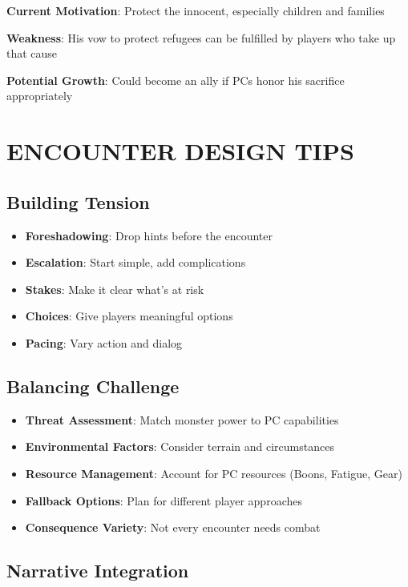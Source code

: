 \documentclass[12pt]{article}
\begin{document}
\begin{itemize}
\textbf{Current Motivation}: Protect the innocent, especially children and families

\textbf{Weakness}: His vow to protect refugees can be fulfilled by players who take up that cause

\textbf{Potential Growth}: Could become an ally if PCs honor his sacrifice appropriately

\section{ENCOUNTER DESIGN TIPS}

\subsection*{Building Tension}

\begin{itemize}
\item \textbf{Foreshadowing}: Drop hints before the encounter
\item \textbf{Escalation}: Start simple, add complications
\item \textbf{Stakes}: Make it clear what's at risk
\item \textbf{Choices}: Give players meaningful options
\item \textbf{Pacing}: Vary action and dialog
\end{itemize}

\subsection*{Balancing Challenge}

\begin{itemize}
\item \textbf{Threat Assessment}: Match monster power to PC capabilities
\item \textbf{Environmental Factors}: Consider terrain and circumstances
\item \textbf{Resource Management}: Account for PC resources (Boons, Fatigue, Gear)
\item \textbf{Fallback Options}: Plan for different player approaches
\item \textbf{Consequence Variety}: Not every encounter needs combat
\end{itemize}

\subsection*{Narrative Integration}


\end{itemize}
\end{document}
